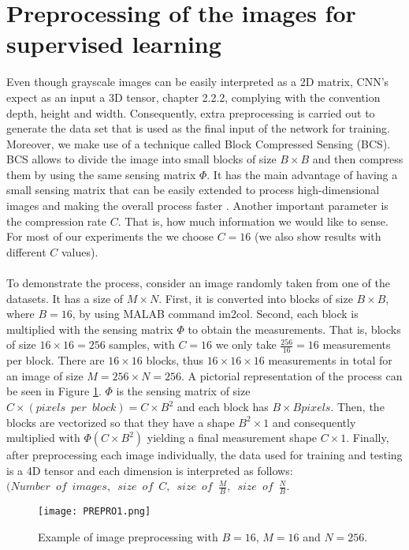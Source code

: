 \section{Preprocessing of the images for supervised learning} \label{sec:prepro}
Even though grayscale images can be easily interpreted as a 2D matrix, CNN's expect as an input a 3D tensor, chapter 2.2.2, complying with the convention depth, height and width. Consequently, extra preprocessing is carried out to generate the data set that is used as the final input of the network for training. Moreover, we make use of a technique called Block Compressed Sensing (BCS). BCS allows to divide the image into small blocks of size $B \times B$ and then compress them by using the same sensing matrix $\Phi$. It has the main advantage of having a small sensing matrix that can be easily extended to process high-dimensional images and making the overall process faster \cite{gan2007block, fowler2012block}. Another important parameter is the compression rate $C$. That is, how much information we would like to sense. For most of our experiments the we choose $C=16$ (we also show results with different $C$ values).           \
\\\\
To demonstrate the process, consider an image randomly taken from one of the datasets. It has a size of $M \times N$. First, it is converted into  blocks of size $B \times B$, where $B=16$, by using MALAB command im2col. Second, each block is multiplied with the sensing matrix $\Phi$ to obtain the measurements. That is, blocks of size $16 \times 16  = 256$ samples, with $C=16$ we only take $ \frac{256}{16}=16$ measurements per block. There are $16 \times 16 $ blocks, thus $16 \times 16 \times 16$ measurements in total for an image of size $M=256 \times N=256$. A pictorial representation of the process can be seen in Figure \ref{fig:PREPROim1}. $\Phi$ is the sensing matrix of size $C \times  ( pixels \enspace per \enspace block) = C \times B^2$ and each block has $B \times B pixels$. Then, the blocks are vectorized so that they have a shape $B^2 \times 1$ and consequently multiplied with $\Phi ( C \times B^2 )$ yielding a final measurement shape $C \times 1 $. Finally, after preprocessing each image individually, the data used for training and testing is a 4D tensor and each dimension is interpreted as follows: $(Number \enspace of \enspace images, \enspace size \enspace of \enspace C ,\enspace size \enspace of \enspace \frac{M}{B} , \enspace size \enspace of \enspace \frac{N}{B}$.  
\begin{figure}[tb] 
\centering 
\texttt{[image: PREPRO1.png]} 
\caption[Preprocessing of images]{Example of image preprocessing  with $B=16$, $M=16$ and $N=256$.}
\label{fig:PREPROim1} 
\end{figure}

